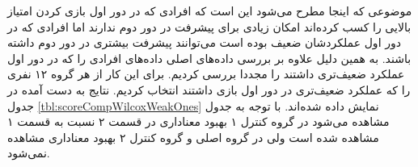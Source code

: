 \documentclass[twoside, a4paper,11pt]{book}
\numberwithin{equation}{chapter}
\numberwithin{table}{chapter}
\numberwithin{figure}{chapter}
\numberwithin{equation}{chapter}
\begin{document}
\begin{table}[]
\end{table}

موضوعی که اینجا مطرح می‌شود این است که افرادی که در دور اول بازی کردن امتیاز بالایی را کسب کرده‌اند امکان زیادی برای پیشرفت در دور دوم ندارند اما افرادی که در دور اول عملکردشان ضعیف بوده است می‌توانند پیشرفت بیشتری در دور دوم داشته باشند. به همین دلیل علاوه بر بررسی داده‌های اصلی داده‌های افرادی را که در دور اول عملکرد ضعیف‌تری داشتند را مجددا بررسی کردیم. برای این کار از هر گروه ۱۲ نفری را که عملکرد ضعیف‌تری در دور اول بازی داشتند انتخاب کردیم. نتایج به دست آمده در جدول \ref{tbl:scoreCompWilcoxWeakOnes} نمایش داده شده‌اند. با توجه به جدول مشاهده می‌شود در گروه کنترل ۱ بهبود معناداری در قسمت ۲ نسبت به قسمت ۱ مشاهده شده است ولی در گروه اصلی و گروه کنترل ۲ بهبود معناداری مشاهده نمی‌شود.
\end{document}
